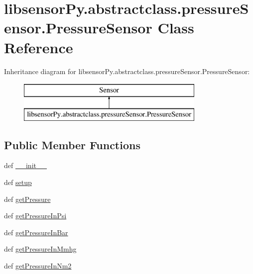 \hypertarget{classlibsensorPy_1_1abstractclass_1_1pressureSensor_1_1PressureSensor}{}\section{libsensor\+Py.\+abstractclass.\+pressure\+Sensor.\+Pressure\+Sensor Class Reference}
\label{classlibsensorPy_1_1abstractclass_1_1pressureSensor_1_1PressureSensor}
Inheritance diagram for libsensor\+Py.\+abstractclass.\+pressure\+Sensor.\+Pressure\+Sensor\+:\begin{figure}[H]
\begin{center}
\leavevmode
\includegraphics[height=2.000000cm]{classlibsensorPy_1_1abstractclass_1_1pressureSensor_1_1PressureSensor}
\end{center}
\end{figure}
\subsection*{Public Member Functions}
\begin{DoxyCompactItemize}
\item 
def \hyperlink{classlibsensorPy_1_1abstractclass_1_1pressureSensor_1_1PressureSensor_a23159f38256b987398656be417964f82}{\+\_\+\+\_\+init\+\_\+\+\_\+}
\item 
def \hyperlink{classlibsensorPy_1_1abstractclass_1_1pressureSensor_1_1PressureSensor_a91f4cd169c75c380fa35e83259cd3290}{setup}
\item 
def \hyperlink{classlibsensorPy_1_1abstractclass_1_1pressureSensor_1_1PressureSensor_ac5e6a7d34a798d68d010bcb15b89eb1a}{get\+Pressure}
\item 
def \hyperlink{classlibsensorPy_1_1abstractclass_1_1pressureSensor_1_1PressureSensor_a0d3a180bcf65cf9d7498f94f454a8c31}{get\+Pressure\+In\+Psi}
\item 
def \hyperlink{classlibsensorPy_1_1abstractclass_1_1pressureSensor_1_1PressureSensor_a711dae9dab2609e6e47e2828a8dc5351}{get\+Pressure\+In\+Bar}
\item 
def \hyperlink{classlibsensorPy_1_1abstractclass_1_1pressureSensor_1_1PressureSensor_ad330086bc71f4b29de3f9902bd7dc84d}{get\+Pressure\+In\+Mmhg}
\item 
def \hyperlink{classlibsensorPy_1_1abstractclass_1_1pressureSensor_1_1PressureSensor_a3e4b9afd2d6a617d0ba2f9a0441157f7}{get\+Pressure\+In\+Nm2}
\end{DoxyCompactItemize}
